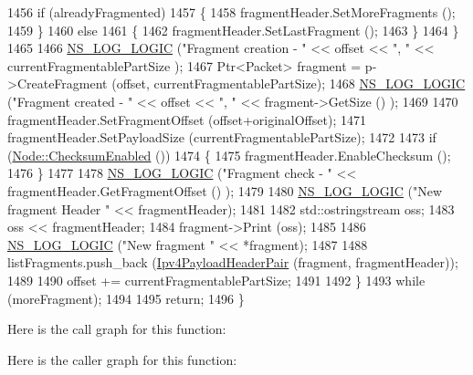 \begin{DoxyCode}
1456           \textcolor{keywordflow}{if} (alreadyFragmented)
1457             \{
1458               fragmentHeader.SetMoreFragments ();
1459             \}
1460           \textcolor{keywordflow}{else}
1461             \{
1462               fragmentHeader.SetLastFragment ();
1463             \}
1464         \}
1465 
1466       \hyperlink{group__logging_ga88acd260151caf2db9c0fc84997f45ce}{NS\_LOG\_LOGIC} (\textcolor{stringliteral}{"Fragment creation - "} << offset << \textcolor{stringliteral}{", "} << currentFragmentablePartSize  );
1467       Ptr<Packet> fragment = p->CreateFragment (offset, currentFragmentablePartSize);
1468       \hyperlink{group__logging_ga88acd260151caf2db9c0fc84997f45ce}{NS\_LOG\_LOGIC} (\textcolor{stringliteral}{"Fragment created - "} << offset << \textcolor{stringliteral}{", "} << fragment->GetSize ()  );
1469 
1470       fragmentHeader.SetFragmentOffset (offset+originalOffset);
1471       fragmentHeader.SetPayloadSize (currentFragmentablePartSize);
1472 
1473       \textcolor{keywordflow}{if} (\hyperlink{classns3_1_1Node_a0515bfe9a3aeb6605d657ba855699815}{Node::ChecksumEnabled} ())
1474         \{
1475           fragmentHeader.EnableChecksum ();
1476         \}
1477 
1478       \hyperlink{group__logging_ga88acd260151caf2db9c0fc84997f45ce}{NS\_LOG\_LOGIC} (\textcolor{stringliteral}{"Fragment check - "} << fragmentHeader.GetFragmentOffset ()  );
1479 
1480       \hyperlink{group__logging_ga88acd260151caf2db9c0fc84997f45ce}{NS\_LOG\_LOGIC} (\textcolor{stringliteral}{"New fragment Header "} << fragmentHeader);
1481 
1482       std::ostringstream oss;
1483       oss << fragmentHeader;
1484       fragment->Print (oss);
1485 
1486       \hyperlink{group__logging_ga88acd260151caf2db9c0fc84997f45ce}{NS\_LOG\_LOGIC} (\textcolor{stringliteral}{"New fragment "} << *fragment);
1487 
1488       listFragments.push\_back (\hyperlink{classns3_1_1Ipv4L3Protocol_a2bf61de1f7739b9ce8b1dac10fb14b31}{Ipv4PayloadHeaderPair} (fragment, fragmentHeader));
1489 
1490       offset += currentFragmentablePartSize;
1491 
1492     \}
1493   \textcolor{keywordflow}{while} (moreFragment);
1494 
1495   \textcolor{keywordflow}{return};
1496 \}
\end{DoxyCode}


Here is the call graph for this function\+:




Here is the caller graph for this function\+:


